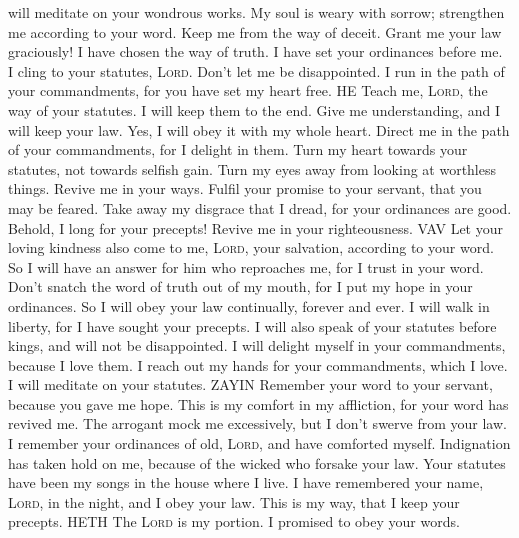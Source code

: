 will meditate on your wondrous works.  My soul is weary
with sorrow; strengthen me according to your word.  Keep
me from the way of deceit. Grant me your law graciously! 
I have chosen the way of truth. I have set your ordinances before me.
 I cling to your statutes, \textsc{Lord}. Don't let me be
disappointed.  I run in the path of your commandments,
for you have set my heart free. HE  Teach me,
\textsc{Lord}, the way of your statutes. I will keep them to the end.
 Give me understanding, and I will keep your law. Yes, I
will obey it with my whole heart.  Direct me in the path
of your commandments, for I delight in them.  Turn my
heart towards your statutes, not towards selfish gain. 
Turn my eyes away from looking at worthless things. Revive me in your
ways.  Fulfil your promise to your servant, that you may
be feared.  Take away my disgrace that I dread, for your
ordinances are good.  Behold, I long for your precepts!
Revive me in your righteousness. VAV  Let your loving
kindness also come to me, \textsc{Lord}, your salvation, according to
your word.  So I will have an answer for him who
reproaches me, for I trust in your word.  Don't snatch
the word of truth out of my mouth, for I put my hope in your ordinances.
 So I will obey your law continually, forever and ever.
 I will walk in liberty, for I have sought your precepts.
 I will also speak of your statutes before kings, and
will not be disappointed.  I will delight myself in your
commandments, because I love them.  I reach out my hands
for your commandments, which I love. I will meditate on your statutes.
ZAYIN  Remember your word to your servant, because you
gave me hope.  This is my comfort in my affliction, for
your word has revived me.  The arrogant mock me
excessively, but I don't swerve from your law.  I
remember your ordinances of old, \textsc{Lord}, and have comforted
myself.  Indignation has taken hold on me, because of the
wicked who forsake your law.  Your statutes have been my
songs in the house where I live.  I have remembered your
name, \textsc{Lord}, in the night, and I obey your law. 
This is my way, that I keep your precepts. HETH  The
\textsc{Lord} is my portion. I promised to obey your words.
